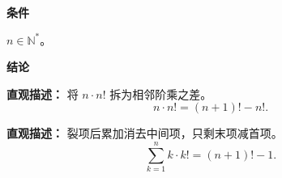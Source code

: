 \begin{statementbox}

	\textbf{\textcolor{CStatement}{条件}}
	\begin{description}[style=nextline, leftmargin=2.8em, labelsep=0.5em, itemsep=0.35em]
		\item[\textbf{\textcolor{CStatement}{条件 1（正整数条件）：}}] $n\in\mathbb{N}^*$。
	\end{description}

	\textbf{\textcolor{CStatement}{结论}}
	\begin{description}[style=nextline, leftmargin=2.8em, labelsep=0.5em, itemsep=0.45em]
		\item[\textbf{\textcolor{CStatement}{结论一（裂项公式）：}}]
			\textbf{\textcolor{CStatement}{直观描述：}}
			将 $n\cdot n!$ 拆为相邻阶乘之差。
			\[
				n\cdot n! = (n+1)! - n!.
			\]

		\item[\textbf{\textcolor{CStatement}{推广结论（求前 $n$ 项和）：}}]
			\textbf{\textcolor{CStatement}{直观描述：}}
			裂项后累加消去中间项，只剩末项减首项。
			\[
				\sum_{k=1}^{n} k\cdot k! = (n+1)! - 1.
			\]
	\end{description}

\end{statementbox}

